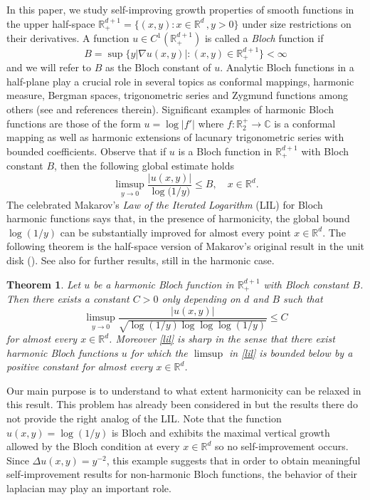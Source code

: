 \documentclass[11pt,letterpaper]{amsart}
\newtheorem{thmx}{Theorem}
\theoremstyle{definition}
\numberwithin{equation}{section}
\newcommand{\R}{\mathbb R}
\newcommand{\C}{\mathbb C}
\begin{document}
In this paper, we study self-improving growth properties of smooth functions in the upper half-space $\R^{d+1}_{+} = \{ (x,y): x\in \R^d \, , y >0 \}$ under size restrictions on their derivatives. A function $u \in C^1 (\R^{d+1}_{+})$ is called a \textit{Bloch} function if 
$$
B= \sup \{y |\nabla u (x,y)|: (x,y) \in \R^{d+1}_{+}\} < \infty
$$ 
and we will refer to $B$ as the Bloch constant of $u$. Analytic Bloch functions in a half-plane play a crucial role in several topics as conformal mappings, harmonic measure,  Bergman spaces, trigonometric series and Zygmund functions among others (see \cite{P, ACP, GM, HKZ, DS, M, M2} and references therein). Significant examples of harmonic Bloch functions are those of the form $u = \log |f'|$ where $f: \R_2^+ \to \C$  is a conformal mapping as well as harmonic extensions of lacunary trigonometric series with bounded coefficients. Observe that if $u$ is a Bloch function in $\R^{d+1}_+$ with Bloch constant $B$, then the following global estimate holds
$$
\limsup_{y\to 0} \frac{|u(x,y)|}{\log \big ( 1/y \big )} \leq B , \quad x \in \R^d. 
$$
The celebrated Makarov's \textit{Law of the Iterated Logarithm} (LIL) for Bloch harmonic functions says that, in the presence of harmonicity, the  global bound $\log (1/y) $ can be substantially improved for almost every point $x\in \R^d$. The following theorem is the half-space version of Makarov's original result in the unit disk (\cite{M, M2}). See also \cite{BM, LL} for further results, still in the harmonic case.  

\begin{thmx}
\label{mak}
Let $u$ be a harmonic Bloch function in $\R^{d+1}_+$ with Bloch constant $B$.
Then there exists a constant $C>0$ only depending on $d$ and $B$ such that
\begin{equation}\label{lil}
\limsup_{y\to 0} \frac{ \displaystyle |u(x,y)| }{\sqrt{\log ( 1/y ) \log \log \log ( 1/y  )} } \leq C
\end{equation}
for almost every $x\in \R^d$. Moreover \eqref{lil} is sharp in the sense that there exist harmonic Bloch functions $u$ for which the $\limsup$ in \eqref{lil} is bounded below by a positive constant for almost every $x \in \R^d$. 
\end{thmx}


Our main purpose is to understand to what extent harmonicity can be relaxed in this result. This problem has already been considered in \cite{GKLN, GK}  but the results there do not provide the right analog of the LIL. Note that the function $u(x,y)= \log(1/y)$ is Bloch and exhibits the maximal vertical growth allowed by the Bloch condition at every $x \in \R^d$ so no self-improvement occurs. Since $\Delta u(x,y) = y^{-2}$, this example suggests that in order to obtain meaningful self-improvement results for non-harmonic Bloch functions, the behavior of their laplacian may play an important role. 
\end{document}
